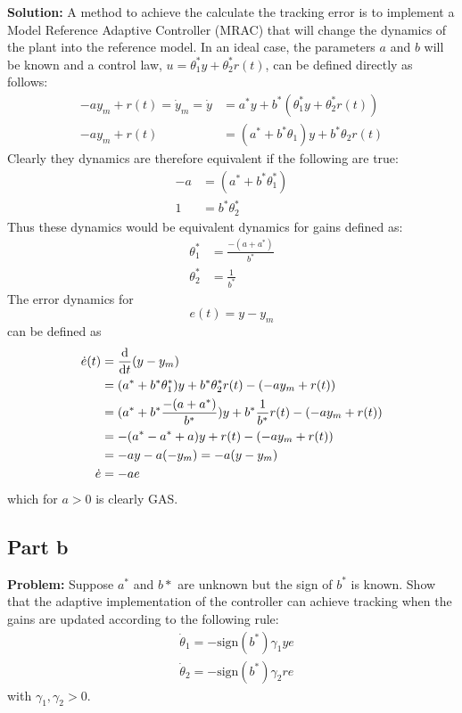 \documentclass[letter]{article}
\begin{document}
\noindent
\textbf{Solution:}
A method to achieve the calculate the tracking error is to implement a Model Reference Adaptive Controller (MRAC) that will change the dynamics of the plant into the reference model. In an ideal case, the parameters $a$ and $b$ will be known and a control law, $u = \theta_1^* y + \theta_2^* r(t)$, can be defined directly as follows:
\begin{align}
	-a y_m + r(t) = \dot{y}_m = \dot{y}
	&= a^* y + b^* (\theta_1^* y + \theta_2^* r(t))\\
	-a y_m + r(t)
	&= (a^* + b^* \theta_1) y + b^* \theta_2 r(t)
\end{align}
Clearly they dynamics are therefore equivalent if the following are true:
\begin{align}
	- a &= (a^* + b^* \theta_1^*)\\
	1	&= b^* \theta_2^*
\end{align}
Thus these dynamics would be equivalent dynamics for gains defined as:
\begin{align}
	\theta_1^* &= \frac{-(a + a^*)}{b^*}\\
	\theta_2^* &= \frac{1}{b^*}
\end{align}
The error dynamics for $$e(t) = y - y_m$$ can be defined as
\begin{align}
	\dot{e}(t) &= \dv{t} (y - y_m)\\
	&= (a^* + b^* \theta_1^*) y + b^* \theta_2^* r(t) - ( -a y_m + r(t))\\
	&= (a^* + b^* \frac{-(a + a^*)}{b^*}) y + b^* \frac{1}{b^*} r(t) - ( -a y_m + r(t))\\
	&= -(a^* - a^* + a)y + r(t) - (-a y_m + r(t))\\
	&= -a y - a (-y_m) = -a (y-y_m)\\
	\dot{e} &= - a e\label{eq:dot_e}
\end{align}
which for $a>0$ is clearly GAS.


\subsection{Part b}
\textbf{Problem:}
Suppose $a^*$ and $b*$ are unknown but the sign of $b^*$ is known. Show that the adaptive implementation of the controller can achieve tracking when the gains are updated according to the following rule:
\begin{equation} \label{eq:dot_theta}
	\begin{aligned}
		& \dot{\theta}_1 = - \text{sign}(b^*) \gamma_1 y e\\
		& \dot{\theta}_2 = - \text{sign}(b^*) \gamma_2 r e
	\end{aligned}
\end{equation}
with $\gamma_1, \gamma_2 > 0$.\\
\end{document}

